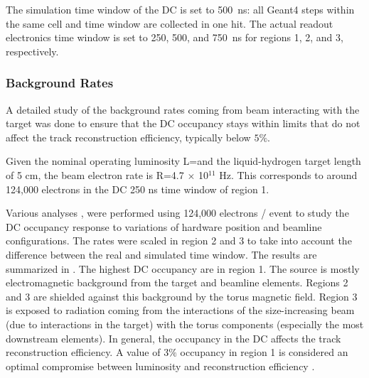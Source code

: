 The simulation time window of the DC is set to 500~ns: all Geant4 steps within the same cell and time window are collected in one hit.
The actual readout electronics time window is set to 250, 500, and 750~ns for regions 1, 2, and 3, respectively.


\subsubsection{Background Rates}

A detailed study of the background rates coming from beam interacting with the target was done to ensure that the DC occupancy stays
within limits that do not affect the track reconstruction efficiency, typically below $5\%$.

Given the nominal operating luminosity L=\cLuminosity and the liquid-hydrogen target length of 5 cm, the beam electron rate
is R=4.7 $\times$ 10$^{11}$ Hz. This corresponds to around 124,000 electrons in the DC 250 ns time window of region 1.

Various analyses \cite{targetStudy, clas12Beamline, clas12Background}, were performed using 124,000 electrons / event
to study the DC occupancy response to variations of hardware position and beamline configurations. The rates were scaled in region 2 and 3 to take into account the
difference between the real and simulated time window.
The results are summarized in . The highest DC occupancy are in region 1. The source is mostly electromagnetic background from the target
and beamline elements. Regions 2 and 3 are shielded against this background by the torus magnetic field. Region 3 is exposed to radiation coming from
the interactions of the size-increasing beam (due to interactions in the target) with the torus components (especially the most downstream elements).
In general, the occupancy in the DC affects the track reconstruction efficiency. A value of 3$\%$ occupancy in region 1
is considered an optimal compromise between luminosity and reconstruction efficiency \cite{recon-nim}.

